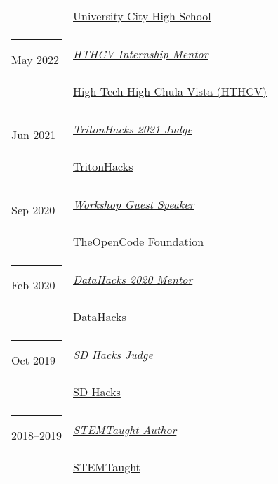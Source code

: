 \documentclass[margin,line]{res}
\begin{document}
\begin{resume}
\begin{longtable}{@{}p{0.7in}p{4in}}
\hspace*{-4mm} & \hspace{4mm} \href{https://uchs.sandiegounified.org/}{University City High School}\\
\hspace*{-4mm} \rule{-1mm}{5mm} May 2022 & \href{http://web.hightechhigh.org/internships/}{\textit{HTHCV Internship Mentor}}\\*
\hspace*{-4mm} & \hspace{4mm} \href{https://www.hightechhigh.org/hthcv/}{High Tech High Chula Vista (HTHCV)}\\
\hspace*{-4mm} \rule{-1mm}{5mm} Jun 2021 & \href{https://www.tritonhacks.org/}{\textit{TritonHacks 2021 Judge}}\\*
\hspace*{-4mm} & \hspace{4mm} \href{https://www.tritonhacks.org/}{TritonHacks}\\
\hspace*{-4mm} \rule{-1mm}{5mm} Sep 2020 & \href{https://www.theopencode.org/}{\textit{Workshop Guest Speaker}}\\*
\hspace*{-4mm} & \hspace{4mm} \href{https://www.theopencode.org/}{TheOpenCode Foundation}\\
\hspace*{-4mm} \rule{-1mm}{5mm} Feb 2020 & \href{http://datahacks.tech/}{\textit{DataHacks 2020 Mentor}}\\*
\hspace*{-4mm} & \hspace{4mm} \href{http://datahacks.tech/}{DataHacks}\\
\hspace*{-4mm} \rule{-1mm}{5mm} Oct 2019 & \href{https://www.sdhacks.io/}{\textit{SD Hacks Judge}}\\*
\hspace*{-4mm} & \hspace{4mm} \href{https://www.sdhacks.io/}{SD Hacks}\\
\hspace*{-4mm} \rule{-1mm}{5mm} 2018--2019 & \href{https://www.stemtaught.com/writingcontestoverview}{\textit{STEMTaught Author}}\\*
\hspace*{-4mm} & \hspace{4mm} \href{https://www.stemtaught.com/}{STEMTaught}\\

\end{longtable}
\end{resume}
\end{document}
